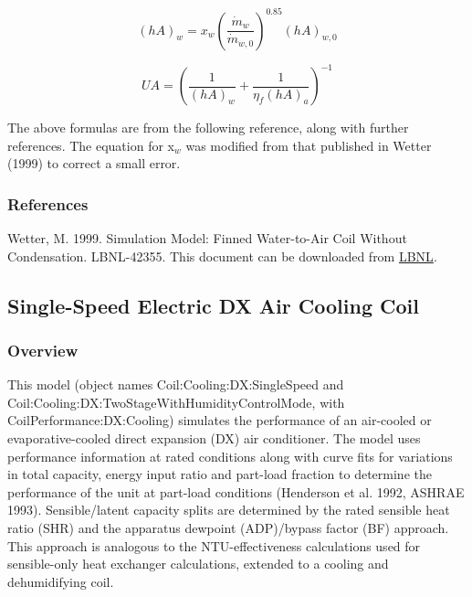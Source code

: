 \begin{equation}
{\left( {hA} \right)_w} = {x_w}{\left( {\frac{{{{\dot m}_w}}}{{{{\dot m}_{w,0}}}}} \right)^{0.85}}{\left( {hA} \right)_{w,0}}
\end{equation}

\begin{equation}
UA = {\left( {\frac{1}{{{{\left( {hA} \right)}_w}}} + \frac{1}{{{\eta_f}{{\left( {hA} \right)}_a}}}} \right)^{ - 1}}
\end{equation}

The above formulas are from the following reference, along with further references. The equation for x\(_{w}\) was modified from that published in Wetter (1999) to correct a small error.

\subsubsection{References}\label{references-1-004}

Wetter, M. 1999. Simulation Model: Finned Water-to-Air Coil Without Condensation. LBNL-42355. This document can be downloaded from \href{http://simulationresearch.lbl.gov}{LBNL}.

\subsection{Single-Speed Electric DX Air Cooling Coil}\label{single-speed-electric-dx-air-cooling-coil}

\subsubsection{Overview}\label{overview-1-004}

This model (object names Coil:Cooling:DX:SingleSpeed and \\ Coil:Cooling:DX:TwoStageWithHumidityControlMode, with CoilPerformance:DX:Cooling) simulates the performance of an air-cooled or evaporative-cooled direct expansion (DX) air conditioner. The model uses performance information at rated conditions along with curve fits for variations in total capacity, energy input ratio and part-load fraction to determine the performance of the unit at part-load conditions (Henderson et al. 1992, ASHRAE 1993). Sensible/latent capacity splits are determined by the rated sensible heat ratio (SHR) and the apparatus dewpoint (ADP)/bypass factor (BF) approach. This approach is analogous to the NTU-effectiveness calculations used for sensible-only heat exchanger calculations, extended to a cooling and dehumidifying coil.

